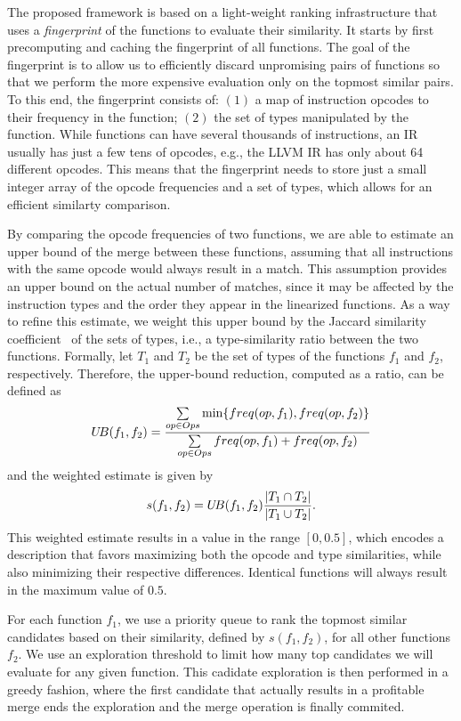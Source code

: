 The proposed framework is based on a light-weight ranking infrastructure that uses a \textit{fingerprint} of the functions to evaluate
their similarity. It starts by first precomputing and caching the fingerprint of all functions. The goal of the fingerprint is to allow us
to efficiently discard unpromising pairs of functions so that we perform the more expensive evaluation only on the topmost similar pairs.
To this end, the fingerprint consists of: $(1)$ a map of instruction opcodes to their frequency in the function; $(2)$ the set of types
manipulated by the function. While functions can have several thousands of instructions, an IR usually has just a few tens of opcodes,
e.g., the LLVM IR has only about 64 different opcodes. This means that the fingerprint needs to store just a small integer array of the
opcode frequencies and a set of types, which allows for an efficient similarty comparison.

By comparing the opcode frequencies of two functions, we are able to estimate
an upper bound of the merge between these functions, assuming that all
instructions with the same opcode would always result in a match.
This assumption provides an upper bound on the actual number of matches, since
it may be affected by the instruction types and the order they appear in the
linearized functions.
As a way to refine this estimate, we weight this upper bound by the Jaccard
similarity coefficient~\cite{jaccard} of the sets of types, i.e., a
type-similarity ratio between the two functions.
Formally, let $T_1$ and $T_2$ be the set of types of the functions $f_1$ and
$f_2$, respectively.
Therefore, the upper-bound reduction, computed as a ratio, can be defined as
\vspace{-1.5ex}\[
   U\!B(f_1,f_2) = \frac{\sum\limits_{op \in Ops} \min\{freq(op,f_1),freq(op,f_2)\}}{\sum\limits_{op \in Ops} freq(op,f_1)+freq(op,f_2)}
\vspace{-1.5ex}
\]
and the weighted estimate is given by
\vspace{-1.5ex}\[
     s(f_1,f_2) = U\!B(f_1,f_2) \frac{|T_1 \cap T_2|}{|T_1 \cup T_2|}.
\vspace{-1.5ex}
\]
This weighted estimate results in a value in the range $[0,0.5]$,
which encodes a description that favors maximizing both the opcode and type
similarities, while also minimizing their respective differences.
Identical functions will always result in the maximum value of $0.5$.

For each function $f_1$, we use a priority queue to rank the topmost
similar candidates based on their similarity, defined by $s(f_1,f_2)$, for all
other functions $f_2$.
We use an exploration threshold to limit how many top candidates we will
evaluate for any given function.
This cadidate exploration is then performed in a greedy fashion, where the first
candidate that actually results in a profitable merge ends the exploration and
the merge operation is finally commited.

